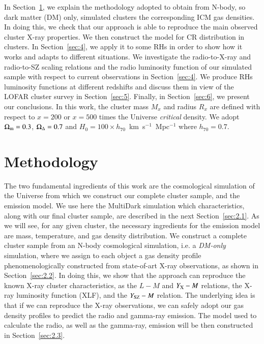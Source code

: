 \documentclass[traditabstract]{aa}
\begin{document}
In Section~\ref{sec:2}, we explain the methodology adopted to obtain from N-body, so dark matter (DM) only, simulated clusters the corresponding ICM gas densities.
In doing this, we check that  our approach is able to reproduce the main observed cluster X-ray properties. We then construct the model for CR distribution 
in clusters. In Section~\ref{sec:4}, we apply it to some RHs in order to show how it works and adapts to different situations. We investigate the radio-to-X-ray and radio-to-SZ scaling relations and the radio luminosity function of our simulated sample with respect to current observations in Section~\ref{sec:4}. We produce RHs luminosity functions at different redshifts and discuss them in view of the LOFAR cluster survey in Section~\ref{sec:5}. Finally, in Section~\ref{sec:6}, we present our conclusions.
In this work, the cluster mass $M_{x}$ and radius $R_{x}$ are defined with respect to $x=200$ or $x=500$ times the Universe \emph{critical} density. We adopt $\Omega_{\rm{m}}=0.3$, $\Omega_{\rm{\Delta}}=0.7$ and $H_0 = 100 \times h_{70}$~km~s$^{-1}$~Mpc$^{-1}$ where $h_{70} = 0.7$. 


\section{Methodology}
\label{sec:2}
The two fundamental ingredients of this work are the cosmological simulation of the Universe from which we construct our complete cluster 
sample, and the emission model. We use here the MultiDark simulation which characteristics, along with our final cluster sample, 
are described in the next Section~\ref{sec:2.1}. 
%
As we will see, for any given cluster, the necessary ingredients for the emission model are mass, temperature, and gas density 
distribution. We construct a complete cluster sample from an N-body cosmological simulation, i.e. a \emph{DM-only} 
simulation, where we assign to each object a gas density profile phenomenologically constructed from state-of-art 
X-ray observations, as shown in Section~\ref{sec:2.2}. In doing this, we show that the approach can reproduce the known 
X-ray cluster characteristics, as the $L- M$ and $Y_{\rm{X}}-M$ relations, the X-ray luminosity function (XLF), and the $Y_{\rm{SZ}}-M$ relation. 
The underlying idea is that if we can reproduce the X-ray observations, we can safely adopt our gas density profiles to predict the radio 
and gamma-ray emission. 
%
The model used to calculate the radio, as well as the gamma-ray, emission will be then constructed in Section~\ref{sec:2.3}.
\end{document}

